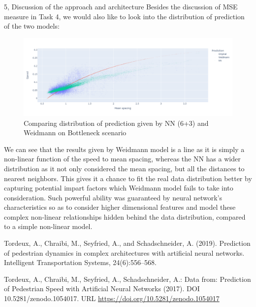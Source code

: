\documentclass[10pt,a4paper]{article}
\begin{document}
\begin{task}{5, Discussion of the approach and architecture}
Besides the discussion of MSE measure in Task 4, we would also like to look into the distribution of prediction of the two models:

\begin{figure} [H]
    \centering
    \includegraphics[width=15cm]{images/Comparing NN-3 and Weidmann on test set.png}
    \caption{Comparing distribution of prediction given by NN (6+3) and Weidmann on Bottleneck scenario}
    \label{compare}
\end{figure}

We can see that the results given by Weidmann model is a line as it is simply a non-linear function of the speed to mean spacing, whereas the NN has a wider distribution as it not only considered the mean spacing, but all the distances to nearest neighbors. This gives it a chance to fit the real data distribution better by capturing potential impart factors which Weidmann model fails to take into consideration. Such powerful ability was guaranteed by neural network's characteristics so as to consider higher dimensional features and model these complex non-linear relationships hidden behind the data distribution, compared to a simple non-linear model.

\end{task}


\newpage


\begin{thebibliography}{9}

Tordeux, A., Chraibi, M., Seyfried, A., and Schadschneider, A. (2019).
Prediction of pedestrian dynamics in complex architectures with artificial neural networks.
Intelligent Transportation Systems, 24(6):556–568.

Tordeux, A., Chraibi, M., Seyfried, A., Schadschneider, A.: Data from: Prediction of Pedestrian Speed with Artificial Neural Networks (2017). DOI 10.5281/zenodo.1054017. URL \url{https://doi.org/10.5281/zenodo.1054017}
\end{thebibliography}
\end{document}
